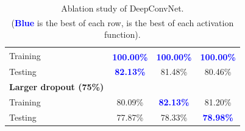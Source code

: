 \begin{table}[htbp]
{\begin{tabular}{l|ccc}
				Training & \textcolor{blue}{\textbf{100.00\%}}\textsuperscript{\textdagger} & \textcolor{blue}{\textbf{100.00\%}}\textsuperscript{\textdagger} & \textcolor{blue}{\textbf{100.00\%}}\textsuperscript{\textdagger} \\ 
				Testing & \textcolor{blue}{\textbf{82.13\%}} & 81.48\% & 80.46\% \\
				\Xhline{3\arrayrulewidth}
				\textbf{Larger dropout (75\%)} & & & \\ 
				Training & 80.09\% & \textcolor{blue}{\textbf{82.13\%}} & 81.20\% \\ 
				Testing & 77.87\% & 78.33\% & \textcolor{blue}{\textbf{78.98\%}} \\
				\hline
			\end{tabular}}
			\caption{Ablation study of DeepConvNet. \\ (\textcolor{blue}{\textbf{Blue}} is the best of each row, \textsuperscript{\textdagger} is the best of each activation function).}
			\label{comp-deepconvnet}
		\end{table}
